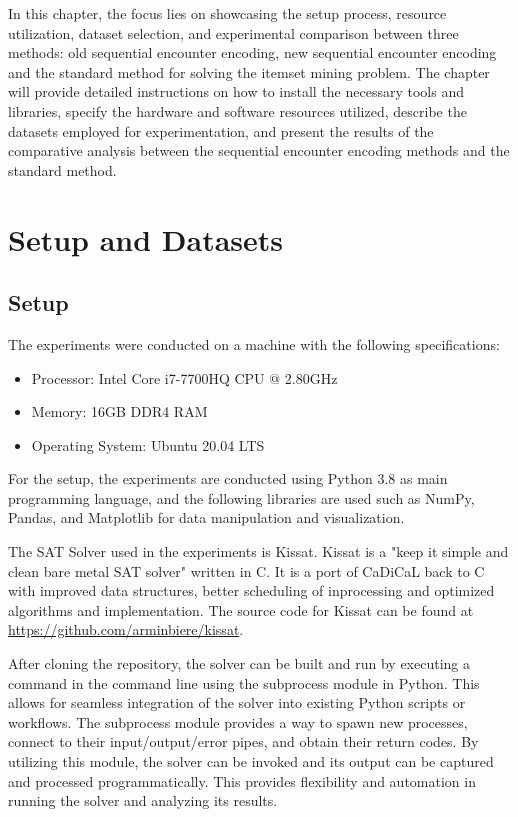 In this chapter, the focus lies on showcasing the setup process, resource utilization, dataset selection,
and experimental comparison between three methods: old sequential encounter encoding, new sequential encounter encoding and the standard method for solving the itemset mining problem.
The chapter will provide detailed instructions on how to install the necessary tools and libraries, specify the hardware and software resources utilized,
describe the datasets employed for experimentation, and present the results of the comparative analysis between the sequential encounter encoding methods and the standard method.
\section{Setup and Datasets}
\subsection{Setup}

The experiments were conducted on a machine with the following specifications:
\begin{itemize}
    \item Processor: Intel Core i7-7700HQ CPU @ 2.80GHz
    \item Memory: 16GB DDR4 RAM
    \item Operating System: Ubuntu 20.04 LTS
\end{itemize}

For the setup, the experiments are conducted using Python 3.8 as main programming language,
and the following libraries are used such as NumPy, Pandas, and Matplotlib for data manipulation and visualization.

The SAT Solver used in the experiments is Kissat.
Kissat is a "keep it simple and clean bare metal SAT solver"
written in C. It is a port of CaDiCaL back to C with improved data structures,
better scheduling of inprocessing and optimized algorithms and implementation.
The source code for Kissat can be found at \url{https://github.com/arminbiere/kissat}.

After cloning the repository, the solver can be built and run by executing a command in the command line using the subprocess module in Python.
This allows for seamless integration of the solver into existing Python scripts or workflows.
The subprocess module provides a way to spawn new processes, connect to their input/output/error pipes, and obtain their return codes.
By utilizing this module, the solver can be invoked and its output can be captured and processed programmatically.
This provides flexibility and automation in running the solver and analyzing its results.

